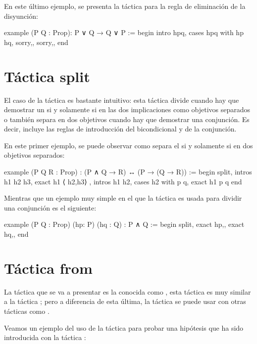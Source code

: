 En este último ejemplo, se presenta la táctica 
para la regla de eliminación de la disyunción:

\begin{leancode}
example (P Q : Prop): P ∨ Q → Q ∨ P :=
begin
  intro hpq,
  cases hpq with hp hq,
  {sorry,},
  {sorry,},
end
\end{leancode}

\section{Táctica split}

El caso de la táctica  es bastante intuitivo:
esta táctica divide cuando hay que demostrar un si y solamente si en las
dos implicaciones como objetivos separados o también separa en dos
objetivos cuando hay que demostrar una conjunción. Es decir, incluye las
reglas de introducción del bicondicional y de la conjunción.

En este primer ejemplo, se puede observar como separa el si y solamente
si en dos objetivos separados:

\begin{leancode}
example (P Q R : Prop) : (P ∧ Q → R) ↔ (P → (Q → R)) :=
begin
  split,
  { intros h1 h2 h3,
    exact h1 ⟨ h2,h3⟩ },
  { intros h1 h2,
    cases h2 with p q,
    exact h1 p q}
end
\end{leancode}

Mientras que un ejemplo muy simple en el que la táctica
 es usada para dividir una conjunción es el
siguiente:
\begin{leancode}
example (P Q : Prop) (hp: P) (hq : Q) : P ∧ Q :=
begin
  split,
  { exact hp,},
  { exact hq,},
end
\end{leancode}

\section{Táctica from}

La táctica que se va a presentar es la conocida como
, esta táctica es muy similar a la táctica
; pero a diferencia de esta última, la táctica
 se puede usar con otras tácticas como
.

Veamos un ejemplo del uso de la táctica  para
probar una hipótesis que ha sido introducida con la táctica
:

